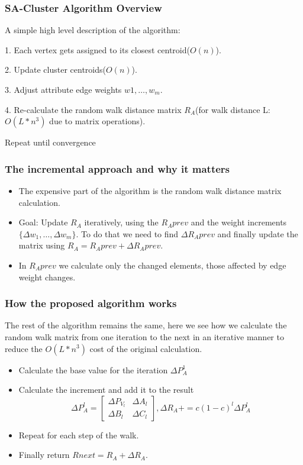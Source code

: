 \documentclass[]{beamer}
\begin{document}
	\begin{frame}
		\frametitle{SA-Cluster Algorithm Overview}
		A simple high level description of the algorithm:
		
		\hspace{\parindent} 1. Each vertex gets assigned to its closest centroid($O(n)$).
		
		\hspace{\parindent} 2. Update cluster centroids($O(n)$).
		
		\hspace{\parindent} 3. Adjust attribute edge weights ${w1,\ldots,w_m}$.
		
		\hspace{\parindent} 4. Re-calculate the random walk distance matrix $R_A$(for walk distance L: $O(L*n^3)$ due to matrix operations).
		
		
		Repeat until convergence
	\end{frame}
	\begin{frame}
		\frametitle{The incremental approach and why it matters}
		\begin{itemize}
		
		\item The expensive part of the algorithm is the random walk distance matrix calculation. 
		
		\item Goal: Update $R_A$ iteratively, using the $R_Aprev$ and the weight increments $\{\Delta w_1, \ldots, \Delta w_m\}$. To do that we need to find $\Delta R_Aprev$ and finally update the matrix using $R_A= R_Aprev + \Delta R_Aprev$.
		
		\item In $R_Aprev$ we calculate only the changed elements, those affected by edge weight changes.
		\end{itemize}
	\end{frame}
	\begin{frame}
		\frametitle{How the proposed algorithm works}
		The rest of the algorithm remains the same, here we see how we calculate the random walk matrix from one iteration to the next in an iterative manner to reduce the $O(L*n^3)$ cost of the original calculation.
		\begin{itemize}
			
			\item Calculate the base value for the iteration $ \Delta P_A^1 $
			\item Calculate the increment and add it to the result
			\[
			\Delta P_A^l = \begin{bmatrix}
				\Delta P_{V_l} & \Delta A_l \\
				\Delta B_l & \Delta C_l 
			\end{bmatrix},
			\Delta R_A += c(1-c)^l\Delta P_A^l
			\]
			\item Repeat for each step of the walk.
			
			\item Finally return $Rnext = R_A + \Delta R_A$.
		\end{itemize}
		
	\end{frame}
\end{document}
